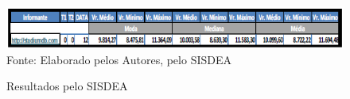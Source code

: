 \begin{figure}[H]
	\centering  \small 		\caption{ Resultados pelo SISDEA}
	\includegraphics[width=0.947\linewidth]{figura/screenshot032}
	\label{fig:screenshot032}\\{ Fonte: Elaborado pelos Autores, pelo SISDEA}
\end{figure}

